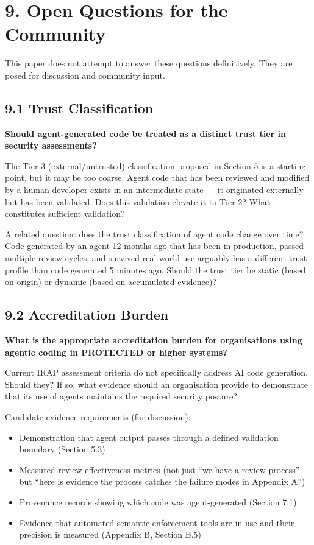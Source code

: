 \documentclass[a4paper,11pt]{report}
\providecommand{\tightlist}{%
  \setlength{\itemsep}{0pt}\setlength{\parskip}{0pt}}
\begin{document}
\hypertarget{open-questions-for-the-community}{%
\section{9. Open Questions for the
Community}\label{open-questions-for-the-community}}

This paper does not attempt to answer these questions definitively. They
are posed for discussion and community input.

\hypertarget{trust-classification}{%
\subsection{9.1 Trust Classification}\label{trust-classification}}

\textbf{Should agent-generated code be treated as a distinct trust tier
in security assessments?}

The Tier 3 (external/untrusted) classification proposed in Section 5 is
a starting point, but it may be too coarse. Agent code that has been
reviewed and modified by a human developer exists in an intermediate
state --- it originated externally but has been validated. Does this
validation elevate it to Tier 2? What constitutes sufficient validation?

A related question: does the trust classification of agent code change
over time? Code generated by an agent 12 months ago that has been in
production, passed multiple review cycles, and survived real-world use
arguably has a different trust profile than code generated 5 minutes
ago. Should the trust tier be static (based on origin) or dynamic (based
on accumulated evidence)?

\hypertarget{accreditation-burden}{%
\subsection{9.2 Accreditation Burden}\label{accreditation-burden}}

\textbf{What is the appropriate accreditation burden for organisations
using agentic coding in PROTECTED or higher systems?}

Current IRAP assessment criteria do not specifically address AI code
generation. Should they? If so, what evidence should an organisation
provide to demonstrate that its use of agents maintains the required
security posture?

Candidate evidence requirements (for discussion):

\begin{itemize}
\tightlist
\item
  Demonstration that agent output passes through a defined validation
  boundary (Section 5.3)
\item
  Measured review effectiveness metrics (not just ``we have a review
  process'' but ``here is evidence the process catches the failure modes
  in Appendix A'')
\item
  Provenance records showing which code was agent-generated (Section
  7.1)
\item
  Evidence that automated semantic enforcement tools are in use and
  their precision is measured (Appendix B, Section B.5)
\end{itemize}
\end{document}
